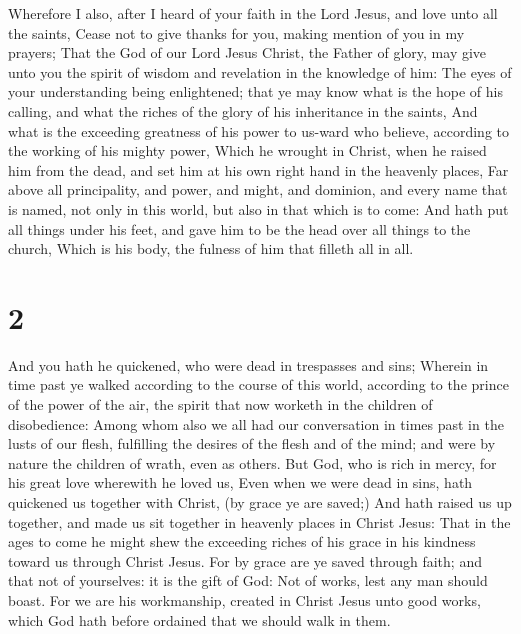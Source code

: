  Wherefore I also, after I heard of your faith in the
Lord Jesus, and love unto all the saints,  Cease not to
give thanks for you, making mention of you in my prayers;
 That the God of our Lord Jesus Christ, the Father of
glory, may give unto you the spirit of wisdom and revelation in the
knowledge of him:  The eyes of your understanding being
enlightened; that ye may know what is the hope of his calling, and what
the riches of the glory of his inheritance in the saints,
 And what is the exceeding greatness of his power to
us-ward who believe, according to the working of his mighty power,
 Which he wrought in Christ, when he raised him from the
dead, and set him at his own right hand in the heavenly places,
 Far above all principality, and power, and might, and
dominion, and every name that is named, not only in this world, but also
in that which is to come:  And hath put all things under
his feet, and gave him to be the head over all things to the church,
 Which is his body, the fulness of him that filleth all
in all.

\hypertarget{section-1}{%
\section{2}\label{section-1}}

 And you hath he quickened, who were dead in trespasses
and sins;  Wherein in time past ye walked according to the
course of this world, according to the prince of the power of the air,
the spirit that now worketh in the children of disobedience:
 Among whom also we all had our conversation in times past
in the lusts of our flesh, fulfilling the desires of the flesh and of
the mind; and were by nature the children of wrath, even as others.
 But God, who is rich in mercy, for his great love
wherewith he loved us,  Even when we were dead in sins,
hath quickened us together with Christ, (by grace ye are saved;)
 And hath raised us up together, and made us sit together
in heavenly places in Christ Jesus:  That in the ages to
come he might shew the exceeding riches of his grace in his kindness
toward us through Christ Jesus.  For by grace are ye saved
through faith; and that not of yourselves: it is the gift of God:
 Not of works, lest any man should boast. 
For we are his workmanship, created in Christ Jesus unto good works,
which God hath before ordained that we should walk in them.

